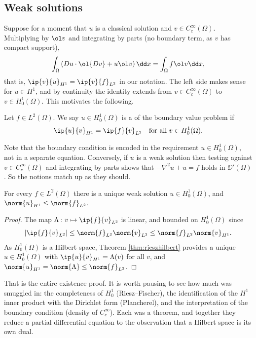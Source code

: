 \subsection{Weak solutions}

Suppose for a moment that $u$ is a classical solution and $v \in C_c^\infty(\Omega)$. Multiplying by $\ol v$ and integrating by parts (no boundary term, as $v$ has compact support),
$$\int_\Omega\left( Du\cdot\ol{Dv}+u\ol v\right)\dd x = \int_\Omega f\ol v\dd x,$$
that is, $\ip{v}{u}_{H^1}=\ip{v}{f}_{L^2}$ in our notation. The left side makes sense for $u \in H^1$, and by continuity the identity extends from $v \in C_c^\infty(\Omega)$ to $v \in H_0^1(\Omega)$. This motivates the following.

\begin{definition}
	Let $f \in L^2(\Omega)$. We say $u \in H_0^1(\Omega)$ is a  of the boundary value problem if
	$$\ip{u}{v}_{H^1}=\ip{f}{v}_{L^2} \quad \text{for all } v \in H_0^1(\Omega).$$
\end{definition}

Note that the boundary condition is encoded in the requirement $u \in H_0^1(\Omega)$, not in a separate equation. Conversely, if $u$ is a weak solution then testing against $v \in C_c^\infty(\Omega)$ and integrating by parts shows that $-\nabla^2u+u=f$ holds in $\DD'(\Omega)$. So the notions match up as they should.

\begin{lemma}\label{lem:dirichletexist}
	For every $f \in L^2(\Omega)$ there is a unique weak solution $u \in H_0^1(\Omega)$, and $\norm{u}_{H^1}\le\norm{f}_{L^2}$.
\end{lemma}

\begin{proof}
	The map $\Lambda : v \mapsto \ip{f}{v}_{L^2}$ is linear, and bounded on $H_0^1(\Omega)$ since
	$$|\ip{f}{v}_{L^2}|\le\norm{f}_{L^2}\norm{v}_{L^2}\le\norm{f}_{L^2}\norm{v}_{H^1}.$$
	As $H_0^1(\Omega)$ is a Hilbert space, Theorem \ref{thm:rieszhilbert} provides a unique $u \in H_0^1(\Omega)$ with $\ip{u}{v}_{H^1}=\Lambda(v)$ for all $v$, and $\norm{u}_{H^1}=\norm{\Lambda}\le\norm{f}_{L^2}$.
\end{proof}

That is the entire existence proof. It is worth pausing to see how much was smuggled in: the completeness of $H_0^1$ (Riesz--Fischer), the identification of the $H^1$ inner product with the Dirichlet form (Plancherel), and the interpretation of the boundary condition (density of $C_c^\infty$). Each was a theorem, and together they reduce a partial differential equation to the observation that a Hilbert space is its own dual.

